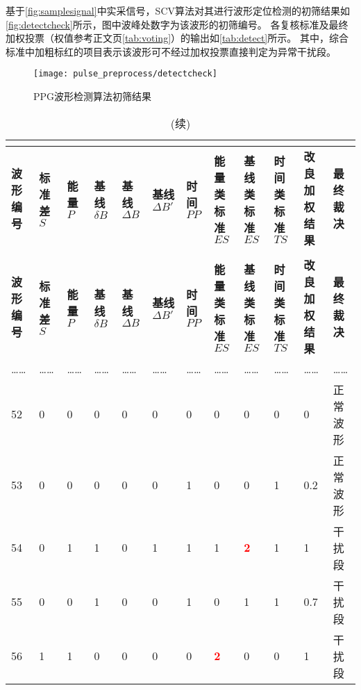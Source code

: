 {基于\autoref{fig:samplesignal}中实采信号，SCV算法对其进行波形定位检测的初筛结果如\autoref{fig:detectcheck}所示，图中波峰处数字为该波形的初筛编号。
各复核标准及最终加权投票（权值参考正文\pageref{tab:voting}页\autoref{tab:voting}）的输出如\autoref{tab:detect}所示。
其中，综合标准中加粗标红的项目表示该波形可不经过加权投票直接判定为异常干扰段。
\begin{figure}[htbp]
    \centering
    \texttt{[image: pulse\_preprocess/detectcheck]}
    \caption{\label{fig:detectcheck}PPG波形检测算法初筛结果}
\end{figure}
\begin{landscape}
	\begin{longtable}{m{1.5cm}<{\centering}m{1.5cm}<{\centering}m{1cm}<{\centering}m{1cm}<{\centering}m{1.5cm}<{\centering}m{1.5cm}<{\centering}m{1.5cm}<{\centering}m{2cm}<{\centering}m{2cm}<{\centering}m{2cm}<{\centering}m{2cm}<{\centering}m{1.5cm}<{\centering}}
		\caption{SCV算法对初筛波形的复核及决策输出(局部)}\\
		\label{tab:detect}\\
		\toprule
        \textbf{波形编号}&\textbf{标准差 $S$}&\textbf{能量 $P$}&\textbf{基线 $\delta B$}&\textbf{基线 $\Delta B$}&\textbf{基线 $\Delta B'$}&\textbf{时间 $PP$}&\textbf{能量类标准 $ES$}&
        \textbf{基线类标准 $ES$}&\textbf{时间类标准 $TS$}&\textbf{改良加权结果}&\textbf{最终裁决}\\
        \midrule
        \endfirsthead
        \caption[]{(续)}\\
        \midrule
        \textbf{波形编号}&\textbf{标准差 $S$}&\textbf{能量 $P$}&\textbf{基线 $\delta B$}&\textbf{基线 $\Delta B$}&\textbf{基线 $\Delta B'$}&\textbf{时间 $PP$}&\textbf{能量类标准 $ES$}&
        \textbf{基线类标准 $ES$}&\textbf{时间类标准 $TS$}&\textbf{改良加权结果}&\textbf{最终裁决}\\
        \midrule
        \endhead 
        \midrule
        \endfoot
        \bottomrule
        \endlastfoot
        …… & …… & …… & …… & …… & …… & …… & …… & …… & …… & …… & ……\\
        52 & 0 & 0 & 0 & 0 & 0 & 0 & 0 & 0 & 0 & 0 & 正常波形\\
        53 & 0 & 0 & 0 & 0 & 0 & 1 & 0 & 0 & 1 & 0.2 & 正常波形\\
        54 & 0 & 1 & 1 & 0 & 1 & 1 & 1 & \textcolor{red}{\textbf{2}}& 1 & 1 & 干扰段\\
        55 & 0 & 0 & 1 & 0 & 0 & 1 & 0 & 1 & 1 & 0.7 & 干扰段\\
        56 & 1 & 1 & 0 & 0 & 0 & 0 & \textcolor{red}{\textbf{2}}& 0 & 0 & 1 & 干扰段\\

\end{longtable}
\end{landscape}}
